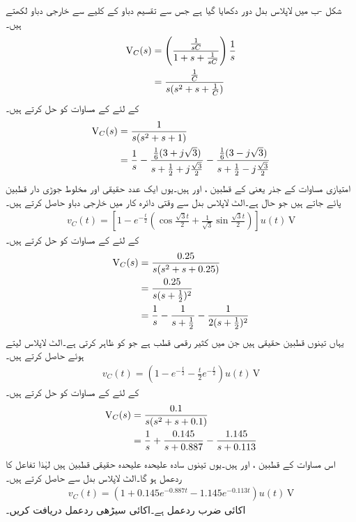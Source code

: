 شکل -ب میں لاپلاس بدل دور دکھایا گیا ہے جس سے تقسیم دباو کے کلیے سے خارجی دباو لکھتے ہیں۔
\begin{align*}
{\ensuremath{{\textup{V}}}}_C(s)&=\left(\frac{\frac{1}{sC}}{1+s+\frac{1}{sC}}\right)\frac{1}{s}\\
&=\frac{\frac{1}{C}}{s(s^2+s+\frac{1}{C})}
\end{align*}
  کے لئے  کے مساوات کو حل کرتے ہیں۔
\begin{align*}
{\ensuremath{{\textup{V}}}}_C(s)&=\frac{1}{s(s^2+s+1)}\\
&=\frac{1}{s}-\frac{\frac{1}{6}(3+j\sqrt{3})}{s+\frac{1}{2}+j\frac{\sqrt{3}}{2}}-\frac{\frac{1}{6}(3-j\sqrt{3})}{s+\frac{1}{2}-j\frac{\sqrt{3}}{2}}
\end{align*}
امتیازی مساوات کے جذر یعنی  کے قطبین ،  اور
  ہیں۔یوں ایک عدد حقیقی اور مخلوط جوڑی دار قطبین پائے جاتے ہیں جو  حال ہے۔الٹ لاپلاس بدل سے وقتی دائرہ کار میں خارجی دباو حاصل کرتے ہیں۔
\begin{align*}
v_C(t)=\left[1-e^{-\frac{t}{2}}\left(\cos \frac{\sqrt{3}t}{2}+\frac{1}{\sqrt{3}}\sin\frac{\sqrt{3}t}{2}\right)\right]u(t)\,\si{\volt}
\end{align*}
  کے لئے  کے مساوات کو حل کرتے ہیں۔
\begin{align*}
{\ensuremath{{\textup{V}}}}_C(s)&=\frac{0.25}{s(s^2+s+0.25)}\\
&=\frac{0.25}{s(s+\frac{1}{2})^2}\\
&=\frac{1}{s}-\frac{1}{s+\frac{1}{2}}-\frac{1}{2(s+\frac{1}{2})^2}
\end{align*}
یہاں تینوں قطبین حقیقی ہیں جن میں  کثیر رقمی قطب ہے جو  کو ظاہر کرتی ہے۔الٹ لاپلاس لیتے ہوئے  حاصل  کرتے ہیں۔
\begin{align*}
v_C(t)=\left(1-e^{-\frac{t}{2}}-\frac{t}{2}e^{-\frac{t}{2}}\right)u(t) \,\si{\volt}
\end{align*}
  کے لئے  کے مساوات کو حل کرتے ہیں۔
\begin{align*}
{\ensuremath{{\textup{V}}}}_C(s)&=\frac{0.1}{s(s^2+s+0.1)}\\
&=\frac{1}{s}+\frac{0.145}{s+0.887}-\frac{1.145}{s+0.113}
\end{align*}
اس مساوات کے قطبین ،  اور  ہیں۔یوں تینوں سادہ علیحدہ علیحدہ حقیقی قطبین ہیں لہٰذا تفاعل کا ردعمل  ہو گا۔الٹ لاپلاس بدل سے  حاصل کرتے ہیں۔
\begin{align*}
v_C(t)=\left(1+0.145e^{-0.887t}-1.145e^{-0.113t}\right)u(t)\,\si{\volt}
\end{align*}
اکائی ضرب ردعمل  ہے۔اکائی سیڑھی ردعمل دریافت کریں۔

